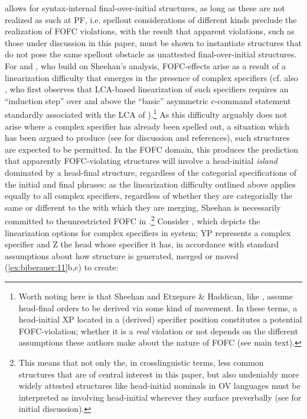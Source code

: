 \documentclass[output=paper]{LSP/langsci}
\begin{document}
 allows for syntax-internal final-over-initial structures, as long as these are not realized as such at PF, i.e. spellout considerations of different kinds preclude the realization of FOFC violations, with the result that apparent violations, such as those under discussion in this paper, must be shown to instantiate structures that do not pose the same spellout obstacle as unattested final-over-initial structures. For \citet{Sheehan2013fofc} and , who build on Sheehan’s analysis, FOFC-effects arise as a result of a linearization difficulty that emerges in the presence of complex specifiers (cf. also \citealt{Uriagereka1999}, who first observes that LCA-based linearization of such specifiers requires an “induction step” over and above the “basic” asymmetric c-command statement standardly associated with the LCA of \citealt{Kayne1994}).\footnote{Worth noting here is that Sheehan and Etxepare \& Haddican, like \citet{BiberauerEtAl2014syntactic}, assume head-final orders to be derived via some kind of movement. In these terms, a head-initial XP located in a (derived) specifier position constitutes a potential FOFC-violation; whether it is a \textit{real} violation or not depends on the different assumptions these authors make about the nature of FOFC (see main text).} As this difficulty arguably does not arise where a complex specifier has already been spelled out, a situation which has been argued to produce  (see \citealt{Sheehan2013fofc} for discussion and references), such structures are expected to be permitted. In the FOFC domain, this produces the prediction that apparently FOFC-violating structures will involve a head-initial \textit{island} dominated by a head-final structure, regardless of the categorial specifications of the initial and final phrases: as the linearization difficulty outlined above applies equally to all complex specifiers, regardless of whether they are categorially the same or different to the  with which they are merging, Sheehan is necessarily committed to the\pagebreak[4]\largerpage[-1] unrestricted FOFC in .\footnote{ This means that not only the, in crosslinguistic terms, less common structures that are of central interest in this paper, but also undeniably more widely attested structures like head-initial nominals in OV languages must be interpreted as involving head-initial  wherever they surface preverbally (see \citet{Sheehan2013fofc} for initial discussion).}  Consider , which depicts the linearization options for complex specifiers in  system; YP represents a complex specifier and Z the head whose specifier it has, in accordance with standard  assumptions about how structure is generated, merged  or moved (\ref{ex:biberauer:11}b,c) to create:
\end{document}
